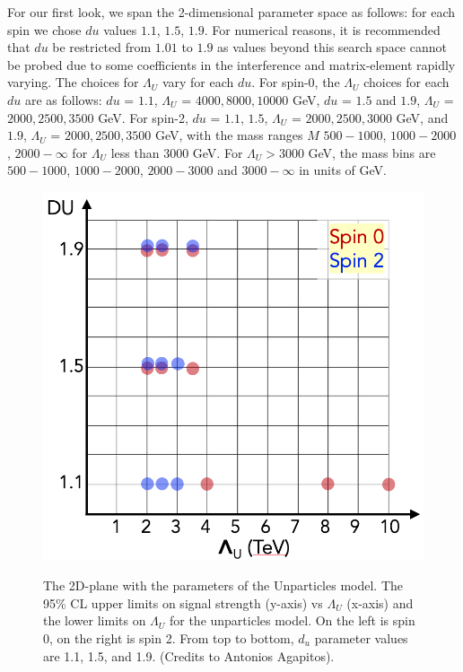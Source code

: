 For our first look, we span the 2-dimensional parameter space as follows: for each spin we chose $du$ values $1.1$, $1.5$, $1.9$. For numerical reasons\cite{KumarEtal:2008}, it is recommended that $du$ be restricted from $1.01$ to $1.9$ as values beyond this search space cannot be probed due to some coefficients in the interference and matrix-element rapidly varying. The choices for $\Lambda_U$ vary for each $du$. For spin-0, the $\Lambda_U$ choices for each $du$ are as follows: $du$ = $1.1$, $\Lambda_U$ = $4000, 8000, 10000$ GeV, $du$ = $1.5$ and $1.9$, $\Lambda_U$ = $2000, 2500, 3500$ GeV. For spin-2, $du$ = $1.1$, $1.5$, $\Lambda_U$ = $2000, 2500, 3000$ GeV, and $1.9$, $\Lambda_U$ = $2000, 2500, 3500$ GeV, with the mass ranges $M$ $500-1000$, $1000-2000$, $2000-\infty$ for $\Lambda_U$ less than $3000$ GeV. For $\Lambda_U > 3000$ GeV, the mass bins are $500-1000$, $1000-2000$, $2000-3000$ and $3000-\infty$ in units of GeV.

\begin{figure}[htbp!]
    \centering
    \caption{The 2D-plane with the parameters of the Unparticles model. The 95\% CL upper limits on signal strength (y-axis) vs $\Lambda_U$ (x-axis) and the lower limits on $\Lambda_U$ for the unparticles model. On the left is spin 0, on the right is spin 2. From top to bottom, $d_{u}$ parameter values are 1.1, 1.5, and 1.9. (Credits to Antonios Agapitos).}
    \includegraphics[scale=0.3]{fig/Unpar_plane.png}
    \label{fig:UnparticlesSearchSpace}
\end{figure}


